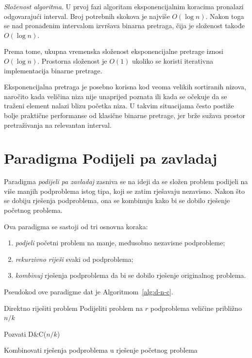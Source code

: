 \textit{Složenost algoritma}. U prvoj fazi algoritam eksponencijalnim koracima pronalazi odgovarajući interval. Broj potrebnih skokova je najviše $O(\log n)$. Nakon toga se nad pronađenim intervalom izvršava binarna pretraga, čija je složenost takođe $O(\log n)$.

Prema tome, ukupna vremenska složenost eksponencijalne pretrage iznosi $O(\log n).$ Prostorna složenost je $O(1)$ ukoliko se koristi iterativna implementacija binarne pretrage.

Eksponencijalna pretraga je posebno korisna kod veoma velikih sortiranih nizova, naročito kada veličina niza nije unaprijed poznata ili kada se očekuje da se traženi element nalazi blizu početka niza. U takvim situacijama često postiže bolje praktične performanse od klasične binarne pretrage, jer brže sužava prostor pretraživanja na relevantan interval.


\section{Paradigma Podijeli pa zavladaj}

Paradigma \textit{podijeli pa zavladaj} zasniva se na ideji da se složen problem podijeli na više manjih podproblema istog tipa, koji se zatim rješavaju nezavisno. Nakon što se dobiju rješenja podproblema, ona se kombinuju kako bi se dobilo rješenje početnog problema.

Ova paradigma se sastoji od tri osnovna koraka:

\begin{enumerate}
	\item \textit{podjeli} početni problem na manje, međusobno nezavisne podprobleme;
	\item \textit{rekurzivno riješi} svaki od podproblema;
	\item \textit{kombinuj} rješenja podproblema da bi se dobilo rješenje originalnog problema.
\end{enumerate}

Pseudokod ove paradigme dat je Algoritmom~\ref{alg:d-n-c}.

\begin{algorithm}
	\begin{algorithmic}[1]
		
		\State Direktno riješiti problem
		\Else
		\State Podijeliti problem na $r$ podproblema veličine približno $n/k$
		
		\State Pozvati \textsc{D\&C}($n/k$)
		\EndFor
		
		\State Kombinovati rješenja podproblema u rješenje početnog problema
		
		\EndIf
		
		\EndProcedure
	\end{algorithmic}
	\caption{Paradigma Podijeli pa zavladaj.}
	\label{alg:d-n-c}
\end{algorithm}

